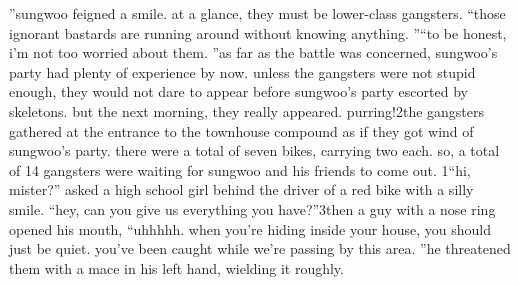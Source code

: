 ”sungwoo feigned a smile.
 at a glance, they must be lower-class gangsters.
“those ignorant bastards are running around without knowing anything.
”“to be honest, i’m not too worried about them.
”as far as the battle was concerned, sungwoo’s party had plenty of experience by now.
unless the gangsters were not stupid enough, they would not dare to appear before sungwoo’s party escorted by skeletons.
but the next morning, they really appeared.
purring!2the gangsters gathered at the entrance to the townhouse compound as if they got wind of sungwoo’s party.
 there were a total of seven bikes, carrying two each.
 so, a total of 14 gangsters were waiting for sungwoo and his friends to come out.
1“hi, mister?” asked a high school girl behind the driver of a red bike with a silly smile.
 “hey, can you give us everything you have?”3then a guy with a nose ring opened his mouth, “uhhhhh.
 when you’re hiding inside your house, you should just be quiet.
 you’ve been caught while we’re passing by this area.
”he threatened them with a mace in his left hand, wielding it roughly.

